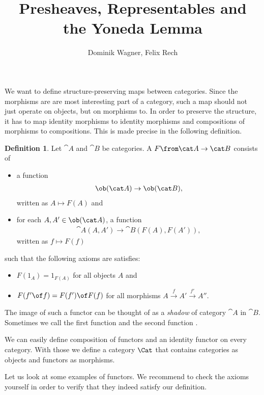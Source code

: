 \documentclass{article}
\theoremstyle{definition}
\newtheorem{definition}{Definition}
\begin{document}
\title{Presheaves, Representables and\\the Yoneda Lemma}
\author{Dominik Wagner, Felix Rech}
\maketitle

We want to define structure-preserving maps between categories.
Since the morphisms are are most interesting part of a category, such a map should not just operate on objects, but on morphisms to.
In order to preserve the structure, it has to map identity morphisms to identity morphisms and compositions of morphisms to compositions.
This is made precise in the following definition.

\begin{definition}
  Let $\cat A$ and $\cat B$ be categories. A  $F \from \cat A\to\cat B$ consists of
    \begin{itemize}
    \item a function
      \begin{align*}
        \ob(\cat A)\to\ob(\cat B),
      \end{align*}
      written as $A\mapsto F(A)$ and
    \item for each $A,A'\in\ob(\cat A)$, a function
      \begin{align*}
        \cat A(A,A')\to\cat B(F(A),F(A')),
      \end{align*}
      written as $f\mapsto F(f)$
    \end{itemize}
    such that the following axioms are satisfies:
    \begin{itemize}
    \item $F(1_A)=1_{F(A)}$ for all objects $A$ and
    \item $F(f'\of f)=F(f')\of F(f)$ for all morphisms $A\xrightarrow{f}A'\xrightarrow{f'}A''$.
    \end{itemize}
\end{definition}

The image of such a functor can be thought of as a \textit{shadow} of category $\cat{A}$ in $\cat{B}$.
Sometimes we call the first function  and the second function .

We can easily define composition of functors and an identity functor on every category.
With those we define a category $\Cat$ that contains categories as objects and functors as morphisms.

Let us look at some examples of functors.
We recommend to check the axioms yourself in order to verify that they indeed satisfy our definition.
\end{document}
